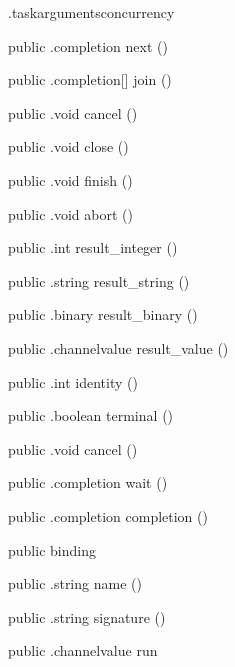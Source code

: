 \begin{CrexxClass}{.taskarguments}{concurrency}
\begin{Members}
    \Method
      {public}
      {.completion}
      {next}
      {()}

    \Method
      {public}
      {.completion[]}
      {join}
      {()}

    \Method
      {public}
      {.void}
      {cancel}
      {()}

    \Method
      {public}
      {.void}
      {close}
      {()}

    \Method
      {public}
      {.void}
      {finish}
      {()}

    \Method
      {public}
      {.void}
      {abort}
      {()}

    \Method
      {public}
      {.int}
      {result\_integer}
      {()}

    \Method
      {public}
      {.string}
      {result\_string}
      {()}

    \Method
      {public}
      {.binary}
      {result\_binary}
      {()}

    \Method
      {public}
      {.channelvalue}
      {result\_value}
      {()}

    \Method
      {public}
      {.int}
      {identity}
      {()}

    \Method
      {public}
      {.boolean}
      {terminal}
      {()}

    \Method
      {public}
      {.void}
      {cancel}
      {()}

    \Method
      {public}
      {.completion}
      {wait}
      {()}

    \Method
      {public}
      {.completion}
      {completion}
      {()}

    \Factory
      {public}
      {binding}
      {}

    \Method
      {public}
      {.string}
      {name}
      {()}

    \Method
      {public}
      {.string}
      {signature}
      {()}

    \Method
      {public}
      {.channelvalue}
      {run}
      {}


\end{Members}
\end{CrexxClass}
